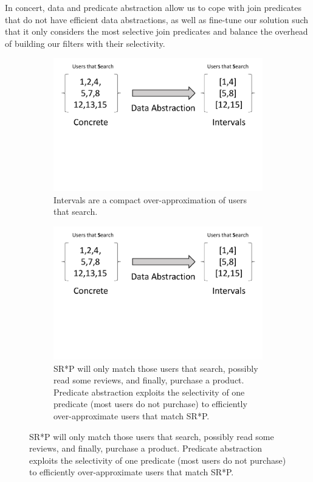 In concert, data and predicate abstraction allow us to cope with join predicates
that do not have efficient data abstractions, as well as fine-tune our solution
such that it only considers the most selective join predicates and balance the
overhead of building our filters with their selectivity.
\begin{figure}
  \centering
  \begin{subfigure}{\columnwidth}
    \centering    
    \includegraphics[clip, page=1,width=\columnwidth]{graphs/motivation.pdf}
    \vspace{-3cm}
    \caption{Intervals are a compact over-approximation of users that search.}
    \label{fig:dabstraction}
  \end{subfigure}
  \begin{subfigure}{\columnwidth}
    \includegraphics[clip, page=2,width=\columnwidth]{graphs/motivation.pdf}
    \caption{SR*P will only match those users that search, possibly read
      some reviews, and finally, purchase a product.  Predicate abstraction
      exploits the selectivity of one predicate (most users do not purchase) to
      efficiently over-approximate users that match SR*P.}
    \label{fig:pabstraction}
  \end{subfigure}
\end{figure}
      
